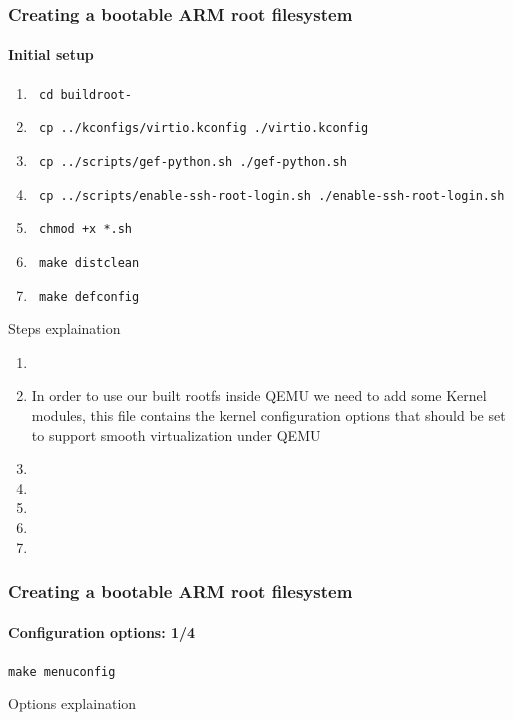  {
  \begin{frame}
    \frametitle{Creating a bootable ARM root filesystem}
    \framesubtitle{Initial setup}

    \begin{enumerate}
      \item \texttt{ cd buildroot-\buildrootLatestVersion }
      \item \texttt{ cp ../kconfigs/virtio.kconfig ./virtio.kconfig }
      \item \texttt{ cp ../scripts/gef-python.sh ./gef-python.sh }
      \item \texttt{ cp ../scripts/enable-ssh-root-login.sh ./enable-ssh-root-login.sh }
      \item \texttt{ chmod +x *.sh }
      \item \texttt{ make distclean }
      \item \texttt{ make defconfig }
    \end{enumerate}

  \end{frame}
   {
    Steps explaination
    \begin{enumerate}
      \item \enteringBuildRootDirectoryDescription
      \item In order to use our built rootfs inside QEMU we need to add some Kernel modules,
        this file contains the kernel configuration options that should be set to support smooth virtualization under QEMU
      \item \gefPythonDescription
      \item \sshRootLoginDescription
      \item \scriptShouldBeExecutableDescription
      \item \makeCleanDescription
      \item \makeDefConfigDescription
    \end{enumerate}
  }

  \begin{frame}
    \frametitle{Creating a bootable ARM root filesystem}
    \framesubtitle{Configuration options: 1/4}
    \texttt{make menuconfig}
    \begin{itemize}
      \targetOptionsList
      \buildOptionsList
    \end{itemize}
  \end{frame}
   {
    Options explaination \\
    \targetOptionsDescription \\
    \buildOptionsDescription
  }

}
